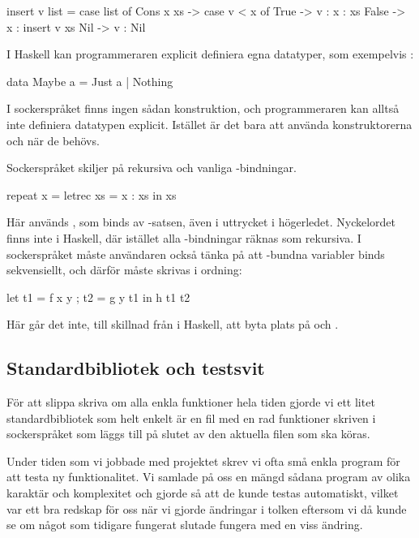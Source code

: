 \documentclass[Rapport]{subfiles}
\begin{document}
\begin{codeEx}
  insert v list = case list of
      Cons x xs -> case v < x of
          True  -> v : x : xs
          False -> x : insert v xs
      Nil -> v : Nil
\end{codeEx}

I Haskell kan programmeraren explicit definiera egna datatyper, som exempelvis :
    
\begin{codeEx}
data Maybe a = Just a | Nothing
\end{codeEx}

I sockerspråket finns ingen sådan konstruktion, och programmeraren kan alltså inte
definiera datatypen explicit. Istället är det bara att använda
konstruktorerna  och  när de behövs.


Sockerspråket skiljer på rekursiva och vanliga -bindningar. 

\begin{codeEx}
repeat x = letrec xs = x : xs in xs  
\end{codeEx}

Här används , som binds av -satsen, även i uttrycket i högerledet.
Nyckelordet  finns inte i Haskell, där istället alla -bindningar räknas som rekursiva. I
sockerspråket måste användaren också tänka på att -bundna variabler binds
sekvensiellt, och därför måste skrivas i ordning:

\begin{codeEx}
let { t1 = f x y
    ; t2 = g y t1
    }
in  h t1 t2
\end{codeEx}

Här går det inte, till skillnad från i Haskell, att byta plats på  och .

\subsection{Standardbibliotek och testsvit}

För att slippa skriva om alla enkla funktioner hela tiden gjorde vi ett litet standardbibliotek
som helt enkelt är en fil med en rad funktioner skriven i sockerspråket som läggs
till på slutet av den aktuella filen som ska köras.

Under tiden som vi jobbade med projektet skrev vi ofta små enkla
program för att testa ny funktionalitet. Vi samlade på oss en mängd sådana program av
olika karaktär och komplexitet och gjorde så att de kunde testas automatiskt, 
vilket var ett bra redskap för oss 
när vi gjorde ändringar i tolken eftersom vi då kunde se om något som tidigare
fungerat slutade fungera med en viss ändring. 
\end{document}
